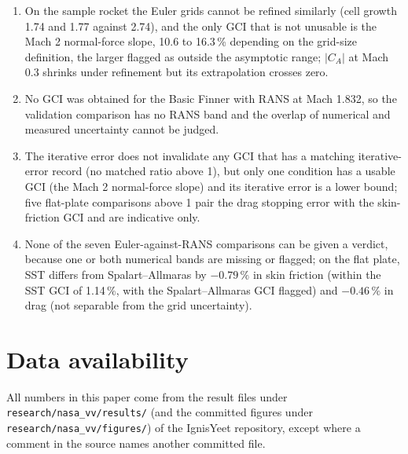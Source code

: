 \documentclass[11pt,a4paper]{article}
\newcommand{\Cp}{C_p}
\begin{document}
\begin{enumerate}
  GCI and the pipeline error, including three-dimensional unstructured meshing, is not quantified; the accepted levels differ
  from the exact cone $\Cp$ by $-2.51$ and $-1.26\,\%$ (descriptive).
\item On the sample rocket the Euler grids cannot be refined similarly (cell growth 1.74 and 1.77 against 2.74), and the only GCI that is not unusable is the Mach 2 normal-force slope, 10.6 to 16.3\,\% depending on the grid-size definition, the larger flagged as outside the asymptotic range;
  $|C_A|$ at Mach 0.3 shrinks under refinement but its extrapolation crosses zero.
\item No GCI was obtained for the Basic Finner with RANS at Mach 1.832, so the validation comparison has no RANS band and the overlap of numerical and measured uncertainty cannot be judged.
\item The iterative error does not invalidate any GCI that has a matching iterative-error record (no matched ratio above 1), but only one condition has a usable GCI (the Mach 2 normal-force slope) and its iterative error is a lower bound; five flat-plate comparisons above 1 pair the drag stopping error with the skin-friction GCI and are indicative only.
\item None of the seven Euler-against-RANS comparisons can be given a verdict, because one or both numerical bands are missing or flagged; on the flat plate, SST differs from Spalart--Allmaras by $-0.79\,\%$ in skin friction (within the SST GCI of 1.14\,\%, with the Spalart--Allmaras GCI flagged) and $-0.46\,\%$ in drag (not separable from the grid uncertainty).
\end{enumerate}

\section*{Data availability}
All numbers in this paper come from the result files under \texttt{research/nasa\_vv/results/}
(and the committed figures under \texttt{research/nasa\_vv/figures/}) of the IgnisYeet repository,
except where a comment in the source names another committed file.



\end{document}
